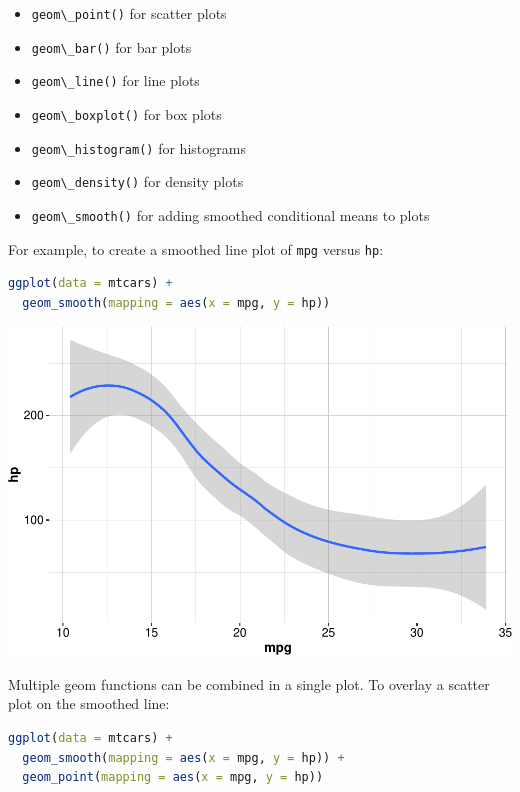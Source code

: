 \documentclass[
]{book}
\newcommand{\passthrough}[1]{#1}
\providecommand{\tightlist}{%
  \setlength{\itemsep}{0pt}\setlength{\parskip}{0pt}}
\theoremstyle{definition}
\theoremstyle{definition}
\theoremstyle{definition}
\theoremstyle{definition}
\theoremstyle{remark}
\begin{document}
\begin{itemize}
\tightlist
\item
  \passthrough{\lstinline!geom\_point()!} for scatter plots\\
\item
  \passthrough{\lstinline!geom\_bar()!} for bar plots\\
\item
  \passthrough{\lstinline!geom\_line()!} for line plots\\
\item
  \passthrough{\lstinline!geom\_boxplot()!} for box plots\\
\item
  \passthrough{\lstinline!geom\_histogram()!} for histograms\\
\item
  \passthrough{\lstinline!geom\_density()!} for density plots\\
\item
  \passthrough{\lstinline!geom\_smooth()!} for adding smoothed conditional means to plots
\end{itemize}

For example, to create a smoothed line plot of \passthrough{\lstinline!mpg!} versus \passthrough{\lstinline!hp!}:

\begin{lstlisting}[language=R]
ggplot(data = mtcars) +
  geom_smooth(mapping = aes(x = mpg, y = hp))
\end{lstlisting}

\begin{center}\includegraphics[width=0.7\linewidth]{Intro-R_files/figure-latex/unnamed-chunk-34-1} \end{center}

Multiple geom functions can be combined in a single plot. To overlay a scatter plot on the smoothed line:

\begin{lstlisting}[language=R]
ggplot(data = mtcars) +
  geom_smooth(mapping = aes(x = mpg, y = hp)) + 
  geom_point(mapping = aes(x = mpg, y = hp))
\end{lstlisting}
\end{document}
